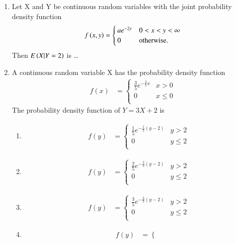 \documentclass[journal,12pt,twocolumn]{IEEEtran}
\begin{document}
\begin{enumerate}
%
\solution

\item Let X and Y be continuous random variables with the joint probability density function 
\begin{align}
f\left(x,y\right)= 
\begin{cases}
ae^{-2y} & 0<x<y<\infty \\
0 & \text{otherwise}.
\end{cases}   
\end{align}
Then $E\left(X|Y=2\right)$ is \dots
\solution

%
\item A continuous random variable X has the probability density function
\begin{align*}
    f(x) &= \begin{cases} 
      \frac{3}{5}e^{-\frac{3}{5}x} & x > 0 \\
      0 & x\leq 0\\
   \end{cases} 
\end{align*} 
The probability density function of $Y=3X+2$  is
\begin{enumerate}
    \item \begin{align*}
         f(y) &= \begin{cases} 
      \frac{1}{5}e^{-\frac{1}{5} (y-2)} & y > 2 \\
      0 & y \leq 2\\
   \end{cases} 
    \end{align*}
\item \begin{align*}
    f(y) &= \begin{cases} 
      \frac{2}{5}e^{-\frac{2}{5} (y-2)} & y > 2 \\
      0 & y \leq 2\\
   \end{cases} 
\end{align*} 
\item  \begin{align*}
    f(y) &= \begin{cases} 
      \frac{3}{5}e^{-\frac{3}{5} (y-2)} & y > 2 \\
      0 & y \leq 2\\
   \end{cases} 
\end{align*} 
\item \begin{align*}
    f(y) &= \begin{cases} 

\end{cases}
\end{align*}
\end{enumerate}
\end{enumerate}
\end{document}
